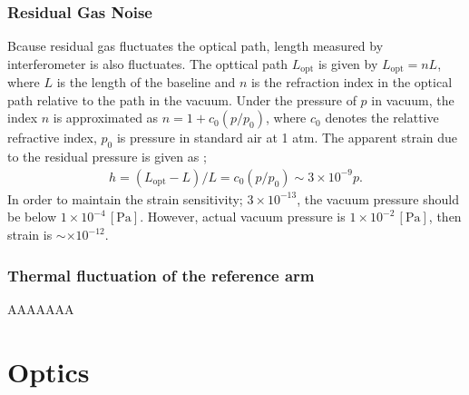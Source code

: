 \subsubsection{Residual Gas Noise}
Bcause residual gas fluctuates the optical path, length measured by interferometer is also fluctuates. The opttical path $L_{\mathrm{opt}}$ is given by $L_{\mathrm{opt}}=nL$, where $L$ is the length of the baseline and $n$ is the refraction index in the optical path relative to the path in the vacuum. Under the pressure of $p$ in vacuum, the index $n$ is approximated as $n = 1 + c_0(p/p_0)$, where $c_0$ denotes the relattive refractive index, $p_0$ is pressure in standard air at 1 atm. The apparent strain due to the residual pressure is given as \cite{ciddor1996refractive};
\begin{eqnarray}
  h = (L_{\mathrm{opt}}-L)/L = c_0(p/p_0) \sim 3\times10^{-9} p.
\end{eqnarray}
In order to maintain the strain sensitivity; $3\times10^{-13}$, the vacuum pressure should be below $1\times10^{-4}\,[\mathrm{Pa}]$. However, actual vacuum pressure is $1\times10^{-2}\,[\mathrm{Pa}]$, then strain is $\sim\times10^{-12}$.

\subsubsection{Thermal fluctuation of the reference arm }
AAAAAAA


\section{Optics} %
